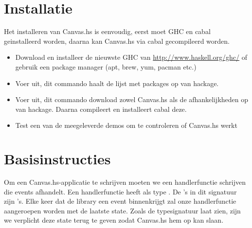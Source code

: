 \section{Installatie}

Het installeren van Canvas.hs is eenvoudig, eerst moet GHC en cabal geinstalleerd worden, daarna kan Canvas.hs via cabal gecompileerd worden.

\begin{itemize}
    \item Download en installeer de nieuwste GHC van \url{http://www.haskell.org/ghc/} of gebruik een package manager (apt, brew, yum, pacman etc.)
    \item Voer  uit, dit commando haalt de lijst met packages op van hackage.
    \item Voer  uit, dit commando download zowel Canvas.hs als de afhankelijkheden op van hackage. Daarna compileert en installeert cabal deze.
    \item Test een van de meegeleverde demos om te controleren of Canvas.hs werkt
\end{itemize}

\section{Basisinstructies}

Om een Canvas.hs-applicatie te schrijven moeten we een handlerfunctie schrijven die events afhandelt. Een handlerfunctie heeft als type . De 's in dit signatuur zijn 's. Elke keer dat de library een event binnenkrijgt zal onze handlerfunctie aangeroepen worden met de laatste state. Zoals de typesignatuur laat zien, zijn we verplicht deze state terug te geven zodat Canvas.hs hem op kan slaan.

